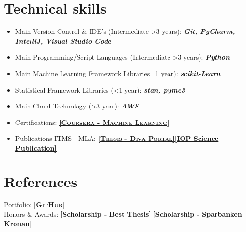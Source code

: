 \documentclass[11pt,a4paper,sans,colorlinks,linkcolor=blue,urlcolor=blue]{moderncv}
\begin{document}
\section{Technical skills}
\begin{itemize}
    \item Main Version Control \& IDE's (Intermediate >3 years): \textbf{\textit{Git, PyCharm, IntelliJ, Visual Studio Code}}
    \item Main Programming/Script Languages (Intermediate >3 years): \textbf{\textit{Python}}
    \item Main Machine Learning Framework Libraries ~1 year): \textbf{\textit{scikit-Learn}}
    \item Statistical Framework Libraries (<1 year): \textbf{\textit{stan, pymc3}}
    \item Main Cloud Technology (>3 year): \textbf{\textit{AWS}}
    \item Certifications: \href{https://www.coursera.org/account/accomplishments/certificate/W5HM63ABYCDV}{\textbf{\textsc{\underline{[Coursera - Machine Learning]}}}}
    \item Publications ITMS - MLA\footnotemark[2]: \href{http://hh.diva-portal.org/smash/record.jsf?pid=diva2%3A1113511&dswid=4291#sthash.wwKv4JYI.dpbs}{\textbf{\textsc{\underline{[Thesis - Diva Portal]}}}}\href{http://iopscience.iop.org/article/10.1088/1757-899X/252/1/012018/pdf;jsessionid=EF9A9E415EC41D639019919DC566B21F.c4.iopscience.cld.iop.org}{\textbf{\underline{[IOP Science Publication]}}}
\end{itemize}
\section{References}
Portfolio: \underline{\href{https://github.com/Thelin90}{\textbf{\textsc{[GitHub]}}}}\\
Honors \& Awards: \href{https://www.hms-networks.com/work/in/sweden/hms-scholarship}{\textbf{\underline{[Scholarship - Best Thesis]}}} \href{http://www.hh.se/omhogskolan/aktuellt/nyheter/nyheter/studenterbelonasavsparbanksstiftelsenkronan.65446700.html}{\textbf{\underline{[Scholarship - Sparbanken Kronan]}}}

     
     
\vfill
\enlargethispage{\footskip}
\end{document}

